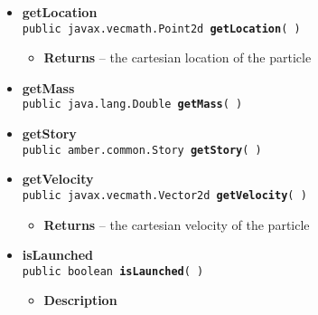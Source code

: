 {{{\begin{itemize}
{\begin{itemize}
{Particles get displaced by the attractors. This method calculates the exact displacement.
}
\item{{\bf Returns} -- 
the cartesian coordinate point containing the actual location of a particle (after displacement by attractors) 
}%
\end{itemize}
}%
 \item{ 
{\bf getLocation}\\
{\tt public javax.vecmath.Point2d\ {\bf getLocation}(  )
\label{amber.showoff.Particle.getLocation()}}%
\begin{itemize}
\item{{\bf Returns} -- 
the cartesian location of the particle 
}%
\end{itemize}
}%
 \item{ 
{\bf getMass}\\
{\tt public java.lang.Double\ {\bf getMass}(  )
\label{amber.showoff.Particle.getMass()}}%
}%
 \item{ 
{\bf getStory}\\
{\tt public amber.common.Story\ {\bf getStory}(  )
\label{amber.showoff.Particle.getStory()}}%
}%
 \item{ 
{\bf getVelocity}\\
{\tt public javax.vecmath.Vector2d\ {\bf getVelocity}(  )
\label{amber.showoff.Particle.getVelocity()}}%
\begin{itemize}
\item{{\bf Returns} -- 
the cartesian velocity of the particle 
}%
\end{itemize}
}%
 \item{ 
{\bf isLaunched}\\
{\tt public boolean\ {\bf isLaunched}(  )
\label{amber.showoff.Particle.isLaunched()}}%
\begin{itemize}
\item{
{\bf Description}

}
\end{itemize}}
\end{itemize}}}}
